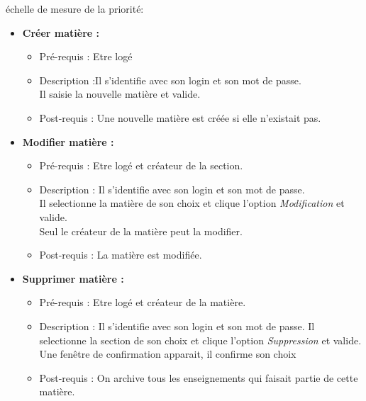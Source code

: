 \begin{center}
{\'e}chelle de mesure de la priorit{\'e}:

\end{center}

\begin{itemize}
\item  {\bf Cr{\'e}er mati{\`e}re :}
	\begin{itemize}
	\item Pr{\'e}-requis : Etre log{\'e} 
	\item Description :Il s'identifie avec son login et son mot de passe. \\
	Il saisie la nouvelle mati{\`e}re et valide.
	\item Post-requis : Une nouvelle mati{\`e}re est cr{\'e}{\'e}e si elle n'existait pas.
	\end{itemize}

\item  {\bf Modifier mati{\`e}re :}
	\begin{itemize}
	\item Pr{\'e}-requis : Etre log{\'e} et cr{\'e}ateur de la section.
	\item Description : Il s'identifie avec son login et son mot de passe.\\
	Il selectionne la mati{\`e}re de son choix et clique l'option {\it Modification} et valide.\\
	Seul le cr{\'e}ateur de la mati{\`e}re peut la modifier.
	\item Post-requis : La mati{\`e}re est modifi{\'e}e.
	\end{itemize}

\item  {\bf Supprimer mati{\`e}re :}
	\begin{itemize}
	\item Pr{\'e}-requis : Etre log{\'e} et cr{\'e}ateur de la mati{\`e}re.
	\item Description : Il s'identifie avec son login et son mot de passe.
	Il selectionne la section de son choix et clique l'option {\it Suppression} et valide.\\
	Une fen{\^e}tre de confirmation apparait, il confirme son choix
	\item Post-requis : On archive tous les enseignements qui faisait partie de cette mati{\`e}re.
	\end{itemize}


\end{itemize}
